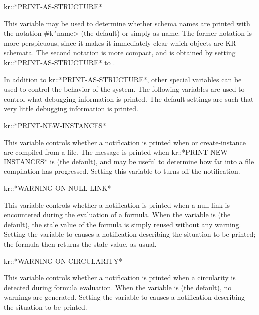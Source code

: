 \value{f-top}
kr::*PRINT-AS-STRUCTURE*\value{variable}
 

This variable may be used to determine whether schema names are printed
with the notation {\sc \#k{\tt\char`\<}name>} (the default) or simply as {\sc name}.  The
former notation is more perspicuous, since it makes it immediately clear
which objects are KR schemata.  The second notation is more compact, and is
obtained by setting kr::*PRINT-AS-STRUCTURE* to \value{nil}.

\value{f-top}

In addition to kr::*PRINT-AS-STRUCTURE*, other special variables
can be used to control the behavior of the system.  The following
variables are used to control what debugging information is printed.
The default settings are such that very little debugging information
is printed.


\value{f-top}
kr::*PRINT-NEW-INSTANCES*\value{variable}
 

This variable controls whether a notification is printed when
 or create-instance are compiled from a file.  The
message is printed when kr::*PRINT-NEW-INSTANCES* is \value{t} (the
default), and may be useful to determine how far into a file compilation
has progressed.  Setting this variable to \value{nil} turns off the
notification.


\value{f-top}
kr::*WARNING-ON-NULL-LINK*\value{variable}
 

This variable controls whether a notification is printed when a null link
is encountered during the evaluation of a formula.  When the variable is
\value{nil} (the default), the stale value of the formula is simply reused
without any warning.  Setting the variable to \value{t} causes a
notification describing the situation to be printed; the formula then
returns the stale value, as usual.



\value{f-top}
kr::*WARNING-ON-CIRCULARITY*\value{variable}
 

This variable controls whether a notification is printed when a circularity
is detected during formula evaluation.  When the variable is \value{nil}
(the default), no warnings are generated.  Setting the variable to
\value{t} causes a notification describing the situation to be printed.



